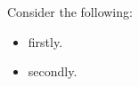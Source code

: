 Consider the following:
\begin{itemize}
        \item firstly.
        \item secondly.
\end{itemize}

